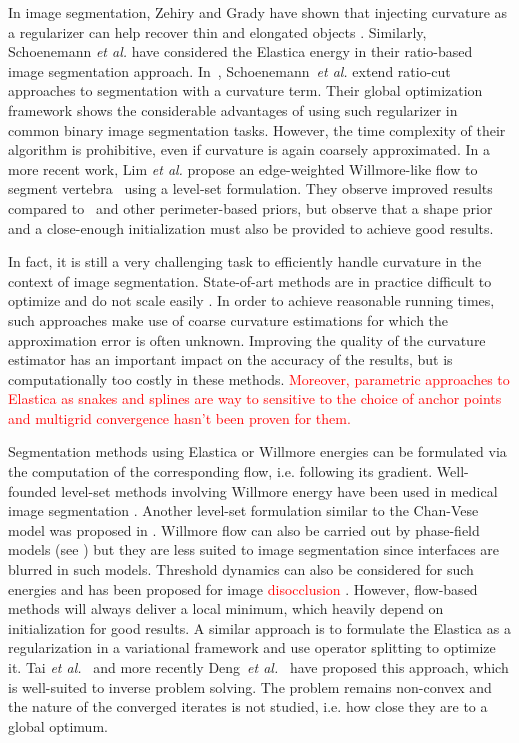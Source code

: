 \documentclass[smallextended]{svjour3}       %
\newcommand{\revision}[1]{\textcolor{red}{#1}}
\begin{document}
In image segmentation, Zehiry and Grady have shown that injecting
curvature as a regularizer can help recover thin and elongated objects
\cite{zehiry10fast}. Similarly, Schoenemann {\em et al.}
\cite{schoenemann09linear} have considered the Elastica energy in
their ratio-based image segmentation
approach. In~\cite{schoenemann2011elastic}, Schoenemann~{\em et al.}
extend ratio-cut approaches to segmentation with a curvature
term. Their global optimization framework shows the considerable
advantages of using such regularizer in common binary image
segmentation tasks.  However, the time complexity of their algorithm
is prohibitive, even if curvature is again coarsely
approximated.  In a more recent work, Lim {\em et al.} propose an
edge-weighted Willmore-like flow to segment
vertebra~\cite{lim2012introducing} using a level-set
formulation. They observe improved results compared
to~\cite{caseles97geodesic} and other perimeter-based priors, but
observe that a shape prior and a close-enough initialization must also be
provided to achieve good results.

In fact, it is still a very challenging task to efficiently handle
curvature in the context of image segmentation.  State-of-art methods
are in practice difficult to optimize and do not scale easily
\cite{zehiry10fast,schoenemann09linear,strandmark11globalframework,nieuwenhuis14efficient}. In
order to achieve reasonable running times, such approaches make use of
coarse curvature estimations for which the approximation error is
often unknown. Improving the quality of the curvature estimator has an
important impact on the accuracy of the results, but is
computationally too costly in these methods. \revision{Moreover, parametric approaches to Elastica  as snakes and splines are way to sensitive to the choice of anchor points and  multigrid convergence hasn't been proven for them.}

Segmentation methods using Elastica or Willmore energies can be
formulated via the computation of the corresponding flow,
i.e. following its gradient. Well-founded level-set methods involving
Willmore energy \cite{droske2004level} have been used in medical image
segmentation \cite{lim2012introducing}. Another level-set formulation
similar to the Chan-Vese model was proposed in
\cite{zhu2013image}. Willmore flow can also be carried out by
phase-field models (see \cite{bretin2015phase}) but they are less
suited to image segmentation since interfaces are blurred in such
models. Threshold dynamics can also be considered for such energies
\cite{esedoglu2008threshold} and has been proposed for image
\revision{disocclusion} \cite{esedoglu2005threshold}. However, flow-based methods
will always deliver a local minimum, which heavily depend on
initialization for good results. A similar approach is to formulate
the Elastica as a regularization in a variational framework and use
operator splitting to optimize it. Tai {\em et
  al.}~\cite{tai11elastica} and more recently Deng~{\em et
  al.}~\cite{deng2019new} have proposed this approach, which is
well-suited to inverse problem solving. The problem remains non-convex
and the nature of the converged iterates is not studied, i.e. how
close they are to a global optimum.
\end{document}
